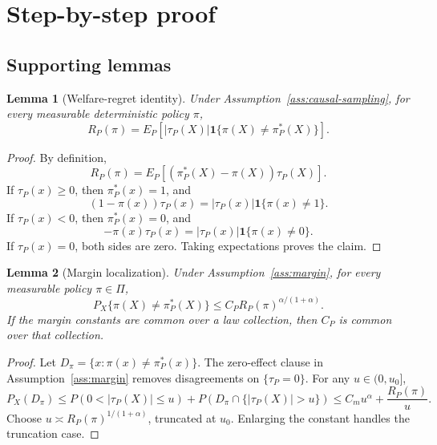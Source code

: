\documentclass[11pt]{article}
\newcommand{\one}{\mathbf{1}}
\theoremstyle{definition}
\theoremstyle{plain}
\newtheorem{lemma}{Lemma}
\theoremstyle{remark}
\begin{document}
\section{Step-by-step proof}
\subsection*{Supporting lemmas}
\begin{lemma}[Welfare-regret identity]\label{lem:welfare-identity}
Under Assumption~\ref{ass:causal-sampling}, for every measurable
deterministic policy \(\pi\),
\[
R_P(\pi)=E_P[|\tau_P(X)|\one\{\pi(X)\ne\pi_P^*(X)\}].
\]
\end{lemma}
\begin{proof}
By definition,
\[
R_P(\pi)
=E_P[(\pi_P^*(X)-\pi(X))\tau_P(X)].
\]
If \(\tau_P(x)\ge0\), then \(\pi_P^*(x)=1\), and
\[
(1-\pi(x))\tau_P(x)
=|\tau_P(x)|\one\{\pi(x)\ne1\}.
\]
If \(\tau_P(x)<0\), then \(\pi_P^*(x)=0\), and
\[
-\pi(x)\tau_P(x)
=|\tau_P(x)|\one\{\pi(x)\ne0\}.
\]
If \(\tau_P(x)=0\), both sides are zero.  Taking expectations proves the
claim.
\end{proof}

\begin{lemma}[Margin localization]\label{lem:margin-localization}
Under Assumption~\ref{ass:margin}, for every measurable policy \(\pi\in\Pi\),
\[
P_X\{\pi(X)\ne\pi_P^*(X)\}
\le C_P R_P(\pi)^{\alpha/(1+\alpha)}.
\]
If the margin constants are common over a law collection, then \(C_P\) is
common over that collection.
\end{lemma}
\begin{proof}
Let \(D_\pi=\{x:\pi(x)\ne\pi_P^*(x)\}\).  The zero-effect clause in
Assumption~\ref{ass:margin} removes disagreements on \(\{\tau_P=0\}\).  For
any \(u\in(0,u_0]\),
\[
P_X(D_\pi)
\le
P(0<|\tau_P(X)|\le u)
+P(D_\pi\cap\{|\tau_P(X)|>u\})
\le C_m u^\alpha+\frac{R_P(\pi)}{u}.
\]
Choose \(u\asymp R_P(\pi)^{1/(1+\alpha)}\), truncated at \(u_0\).  Enlarging
the constant handles the truncation case.
\end{proof}
\end{document}
